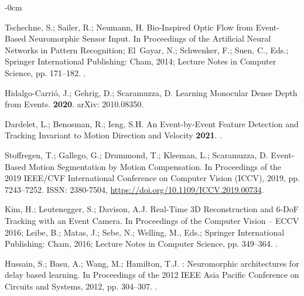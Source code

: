 \documentclass[brainsci, %
               review,submit,pdftex,moreauthors
               ]{Definitions/mdpi}
\begin{document}
\begin{adjustwidth}{-\extralength}{0cm}
\begin{thebibliography}{999}
  Tschechne, S.; Sailer, R.; Neumann, H.
  \newblock Bio-{Inspired} {Optic} {Flow} from {Event}-{Based} {Neuromorphic}
    {Sensor} {Input}.
  \newblock In Proceedings of the Artificial {Neural} {Networks} in {Pattern}
    {Recognition}; El~Gayar, N.; Schwenker, F.; Suen, C., Eds.; Springer
    International Publishing: Cham,  2014; Lecture {Notes} in {Computer}
    {Science}, pp. 171--182.
  .
  
  Hidalgo-Carrió, J.; Gehrig, D.; Scaramuzza, D.
  \newblock Learning {Monocular} {Dense} {Depth} from {Events}.
   {\bf 2020}.
  \newblock arXiv: 2010.08350.
  
  Dardelet, L.; Benosman, R.; Ieng, S.H.
  \newblock An {Event}-by-{Event} {Feature} {Detection} and {Tracking}
    {Invariant} to {Motion} {Direction} and {Velocity} {\bf 2021}.
  .
  
  Stoffregen, T.; Gallego, G.; Drummond, T.; Kleeman, L.; Scaramuzza, D.
  \newblock Event-{Based} {Motion} {Segmentation} by {Motion} {Compensation}.
  \newblock In Proceedings of the 2019 {IEEE}/{CVF} {International} {Conference}
    on {Computer} {Vision} ({ICCV}),  2019, pp. 7243--7252.
  \newblock ISSN: 2380-7504, {\url{https://doi.org/10.1109/ICCV.2019.00734}}.
  
  Kim, H.; Leutenegger, S.; Davison, A.J.
  \newblock Real-{Time} {3D} {Reconstruction} and 6-{DoF} {Tracking} with an
    {Event} {Camera}.
  \newblock In Proceedings of the Computer {Vision} – {ECCV} 2016; Leibe, B.;
    Matas, J.; Sebe, N.; Welling, M., Eds.; Springer International Publishing:
    Cham,  2016; Lecture {Notes} in {Computer} {Science}, pp. 349--364.
  .
  
  Hussain, S.; Basu, A.; Wang, M.; Hamilton, T.J.
  : {Neuromorphic} architectures for delay based learning.
  \newblock In Proceedings of the 2012 {IEEE} {Asia} {Pacific} {Conference} on
    {Circuits} and {Systems},  2012, pp. 304--307.
  .
  

\end{thebibliography}
\end{adjustwidth}
\end{document}

